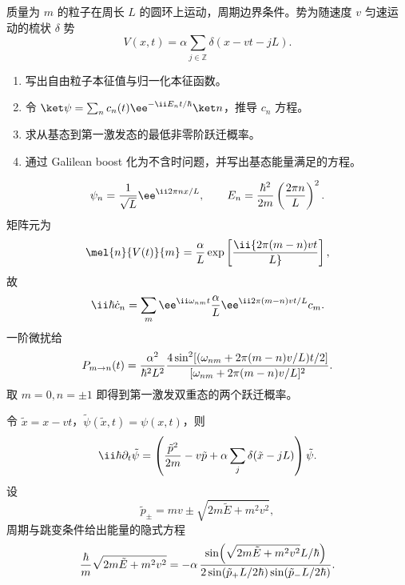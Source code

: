 \begin{question}
质量为 $m$ 的粒子在周长 $L$ 的圆环上运动，周期边界条件。势为随速度 $v$ 匀速运动的梳状 $\delta$ 势
\[
  V(x,t)=\alpha\sum_{j\in\mathbb Z}\delta(x-vt-jL).
\]
\begin{enumerate}
  \item 写出自由粒子本征值与归一化本征函数。
  \item 令 $\ket\psi=\sum_n c_n(t)\ee^{-\ii E_nt/\hbar}\ket n$，推导 $c_n$ 方程。
  \item 求从基态到第一激发态的最低非零阶跃迁概率。
  \item 通过 Galilean boost 化为不含时问题，并写出基态能量满足的方程。
\end{enumerate}
\begin{solution}
\[
  \psi_n={1\over\sqrt L}\ee^{\ii2\pi nx/L},\qquad
  E_n={\hbar^2\over2m}\left({2\pi n\over L}\right)^2 .
\]
矩阵元为
\[
  \mel{n}{V(t)}{m}={\alpha\over L}\exp\left[\ii{2\pi(m-n)vt\over L}\right],
\]
故
\[
  \ii\hbar\dot c_n=\sum_m \ee^{\ii\omega_{nm}t}{\alpha\over L}
  \ee^{\ii2\pi(m-n)vt/L}c_m .
\]
一阶微扰给
\[
  P_{m\to n}(t)={\alpha^2\over\hbar^2L^2}
  {4\sin^2[(\omega_{nm}+2\pi(m-n)v/L)t/2]
  \over[\omega_{nm}+2\pi(m-n)v/L]^2}.
\]
取 $m=0,n=\pm1$ 即得到第一激发双重态的两个跃迁概率。

令 $\tilde x=x-vt$，$\tilde\psi(\tilde x,t)=\psi(x,t)$，则
\[
  \ii\hbar\partial_t\tilde\psi=\left({\tilde p^2\over2m}-v\tilde p
  +\alpha\sum_j\delta(\tilde x-jL)\right)\tilde\psi .
\]
设
\[
  \tilde p_\pm=mv\pm\sqrt{2m\tilde E+m^2v^2},
\]
周期与跳变条件给出能量的隐式方程
\[
  {\hbar\over m}\sqrt{2m\tilde E+m^2v^2}
  =-\alpha\,{\sin\!\left(\sqrt{2m\tilde E+m^2v^2}L/\hbar\right)
  \over2\sin(\tilde p_+L/2\hbar)\sin(\tilde p_-L/2\hbar)} .
\]
\end{solution}
\end{question}

